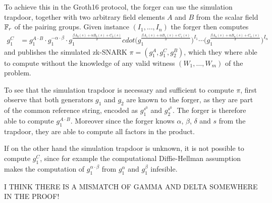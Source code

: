 To achieve this in the Groth16 protocol, the forger can use the simulation trapdoor, together with two arbitrary field elements $A$ and $B$ from the scalar field $\mathbb{F}_r$ of the pairing groups. Given instance $(I_1,\ldots,I_n)$ the forger then computes 
\begin{align*}
g_1^C & = g_1^{A\cdot B}\cdot g_1^{-\alpha\cdot \beta}\cdot 
      g_1^{\frac{\beta A_0(s) + \alpha B_0(s)+ C_0(s)}{\delta}}cdot      
      \Big(g_1^{\frac{\beta A_1(s) + \alpha B_1(s)+ C_1(s)}{\delta}}\Big)^{I_1}\cdots
      \Big(g_1^{\frac{\beta A_n(s) + \alpha B_n(s)+ C_n(s)}{\delta}}\Big)^{I_n}\
\end{align*}  
and publishes the simulated zk-SNARK $\pi = (g_1^A, g_1^C, g_2^B)$, which they where able to compute without the knowledge of any valid witness $(W_1,\ldots,W_m)$ of the problem.

To see that the simulation trapdoor is necessary and sufficient to compute $\pi$, first observe that both generators $g_1$ and $g_2$ are known to the forger, as they are part of the common reference string, encoded as $g_1^{s^0}$ and $g_2^{s^0}$. The forger is therefore able to compute $g_1^{A\cdot B}$. Moreover since the forger knows $\alpha$, $\beta$, $\delta$ and $s$ from the trapdoor, they are able to compute all factors in the product.

If on the other hand the simulation trapdoor is unknown, it is not possible to compute $g_1^C$, since for example the computational Diffie-Hellman assumption makes the computation of $g_1^{\alpha\cdot \beta}$ from $g_1^\alpha$ and $g_1^\beta$ infesible.

I THINK THERE IS A MISMATCH OF GAMMA AND DELTA SOMEWHERE IN THE PROOF!

